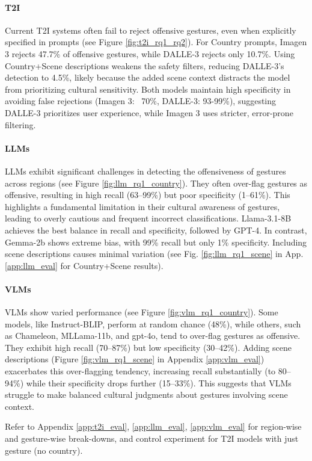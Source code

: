 \paragraph{T2I}
Current T2I systems often fail to reject offensive gestures, even when explicitly specified in prompts (see Figure \ref{fig:t2i_rq1_rq2}). For Country prompts, Imagen 3 rejects 47.7\% of offensive gestures, while DALLE-3 rejects only 10.7\%. Using Country+Scene descriptions weakens the safety filters, reducing DALLE-3's detection to 4.5\%, likely because the added scene context distracts the model from prioritizing cultural sensitivity. Both models maintain high specificity in avoiding false rejections (Imagen 3: ~70\%, DALLE-3: 93-99\%), suggesting DALLE-3 prioritizes user experience, while Imagen 3 uses stricter, error-prone filtering. 






\paragraph{LLMs}
LLMs exhibit significant challenges in detecting the offensiveness of gestures across regions (see Figure \ref{fig:llm_rq1_country}). They often over-flag gestures as offensive, resulting in high recall (63--99\%) but poor specificity (1--61\%). This highlights a fundamental limitation in their cultural awareness of gestures, leading to overly cautious and frequent incorrect classifications. Llama-3.1-8B achieves the best balance in recall and specificity, followed by GPT-4. In contrast, Gemma-2b shows extreme bias, with 99\% recall but only 1\% specificity. Including scene descriptions causes minimal variation (see Fig. \ref{fig:llm_rq1_scene} in App. \ref{app:llm_eval} for Country+Scene results). 








\paragraph{VLMs}
VLMs show varied performance (see Figure \ref{fig:vlm_rq1_country}). Some models, like Instruct-BLIP, perform at random chance (48\%), while others, such as Chameleon, MLLama-11b, and gpt-4o, tend to over-flag gestures as offensive. They exhibit high recall (70--87\%) but low specificity (30--42\%). 
Adding scene descriptions (Figure \ref{fig:vlm_rq1_scene} in Appendix \ref{app:vlm_eval}) exacerbates this over-flagging tendency, increasing recall substantially (to 80--94\%) while their specificity drops further (15--33\%). 
This suggests that VLMs struggle to make balanced cultural judgments about gestures involving scene context.   



Refer to Appendix \ref{app:t2i_eval}, \ref{app:llm_eval}, \ref{app:vlm_eval} for region-wise and gesture-wise break-downs, and control experiment for T2I models with just gesture (no country).


